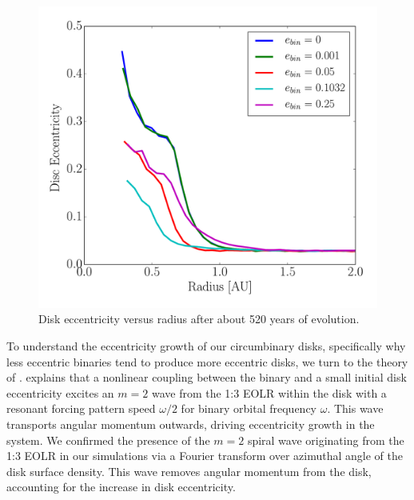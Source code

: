 \begin{figure}
	\includegraphics[width=\columnwidth]{f3}
    \caption{Disk eccentricity versus radius after about 520 years of evolution.}
    \label{fig:CBDiskDiskEccRad}
\end{figure}

To understand the eccentricity growth of our circumbinary disks,
specifically why less eccentric binaries tend to produce more
eccentric disks, we turn to the theory of \citet{Papaloizou2001}.
\citet{Papaloizou2001} explains that a nonlinear coupling between the
binary and a small initial disk eccentricity excites an $m = 2$ wave
from the 1:3 EOLR within the disk with a resonant forcing pattern
speed $\omega/2$ for binary orbital frequency $\omega$.  This wave
transports angular momentum outwards, driving eccentricity growth in
the system.  We confirmed the presence of the $m = 2$ spiral wave
originating from the 1:3 EOLR in our simulations via a Fourier transform over azimuthal
angle of the disk surface density.  This wave removes angular momentum from the disk, accounting for the increase in disk eccentricity.  

